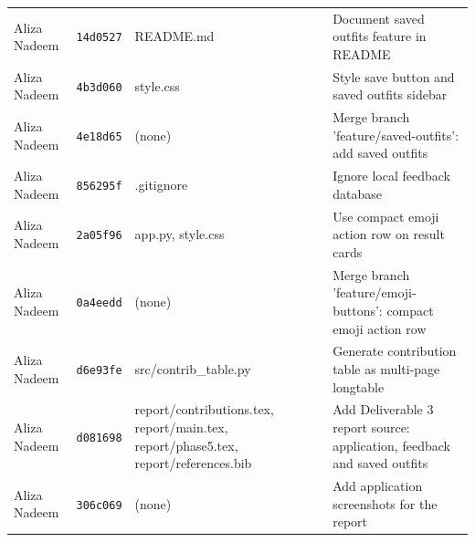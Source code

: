 \begin{longtable}{p{2.6cm}p{1.3cm}p{4.4cm}p{6.2cm}}
Aliza Nadeem & \texttt{14d0527} & README.md & Document saved outfits feature in README \\
Aliza Nadeem & \texttt{4b3d060} & style.css & Style save button and saved outfits sidebar \\
Aliza Nadeem & \texttt{4e18d65} & (none) & Merge branch 'feature/saved-outfits': add saved outfits \\
Aliza Nadeem & \texttt{856295f} & .gitignore & Ignore local feedback database \\
Aliza Nadeem & \texttt{2a05f96} & app.py, style.css & Use compact emoji action row on result cards \\
Aliza Nadeem & \texttt{0a4eedd} & (none) & Merge branch 'feature/emoji-buttons': compact emoji action row \\
Aliza Nadeem & \texttt{d6e93fe} & src/contrib\_table.py & Generate contribution table as multi-page longtable \\
Aliza Nadeem & \texttt{d081698} & report/contributions.tex, report/main.tex, report/phase5.tex, report/references.bib & Add Deliverable 3 report source: application, feedback and saved outfits \\
Aliza Nadeem & \texttt{306c069} & (none) & Add application screenshots for the report \\
\end{longtable}
